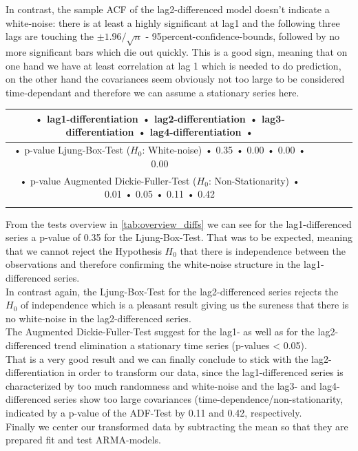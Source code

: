 \documentclass[11pt,a4paper]{article}
\begin{document}
In contrast, the sample ACF of the lag2-differenced model doesn't indicate a white-noise: there is at least a highly significant at lag1 and the following three lags are touching the $\pm 1.96 / \sqrt{n}$ - 95percent-confidence-bounds, followed by no more significant bars which die out quickly.
This is a good sign, meaning that on one hand we have at least correlation at lag 1 which is needed to do prediction, on the other hand the covariances seem obviously not too large to be considered time-dependant and therefore we can assume a stationary series here.

\begin{tabular}{|c|c|c|c|c|}
\hline 
• lag1-differentiation • lag2-differentiation • lag3-differentiation • lag4-differentiation • \\ 
\hline 
• p-value Ljung-Box-Test
($H_0$: White-noise) • 0.35 • 0.00 • 0.00 • 0.00\\ 
\hline 
• p-value Augmented Dickie-Fuller-Test
($H_0$: Non-Stationarity) • 0.01 • 0.05 • 0.11 • 0.42\\ 
\hline 
\label{tab:overview_diffs}
\end{tabular} 

From the tests overview in \cref{tab:overview_diffs} we can see for the lag1-differenced series a p-value of 0.35 for the Ljung-Box-Test.
That was to be expected, meaning that we cannot reject the Hypothesis $H_0$ that there is independence between the observations \citep{LjungBox78} and therefore confirming the white-noise structure in the lag1-differenced series. \\
In contrast again, the Ljung-Box-Test for the lag2-differenced series rejects the $H_0$ of independence which is a pleasant result giving us the sureness that there is no white-noise in the lag2-differenced series.\\
The Augmented Dickie-Fuller-Test suggest for the lag1- as well as for the lag2-differenced trend elimination a stationary time series (p-values < 0.05).\\
That is a very good result and we can finally conclude to stick with the lag2-differentiation in order to transform our data, since the lag1-differenced series is characterized by too much randomness and white-noise and the lag3- and lag4-differenced series show too large covariances (time-dependence/non-stationarity, indicated by a p-value of the ADF-Test by 0.11 and 0.42, respectively.\\
Finally we center our transformed data by subtracting the mean so that they are prepared fit and test ARMA-models.
\end{document}
